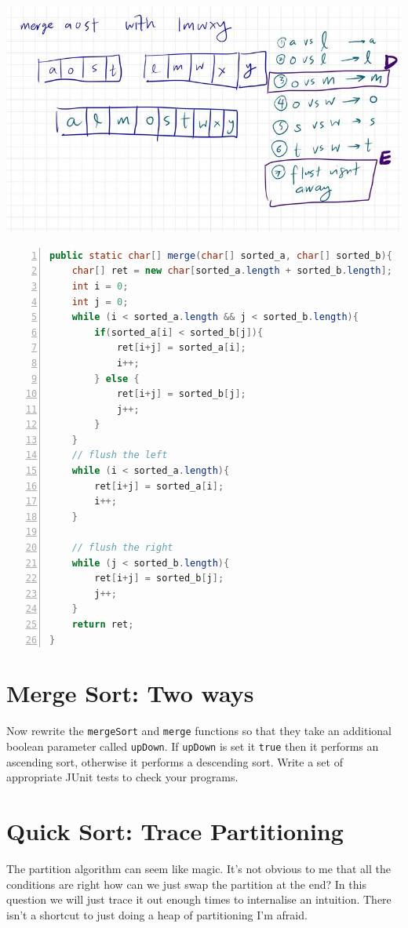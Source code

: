 \documentclass[twoside=false,DIV=14]{scrartcl}
\begin{document}
\includegraphics[width=\textwidth]{merge_trace_plus.jpeg}

\begin{lstlisting}[language=java,numbers=left]
public static char[] merge(char[] sorted_a, char[] sorted_b){
    char[] ret = new char[sorted_a.length + sorted_b.length];
    int i = 0;
    int j = 0;
    while (i < sorted_a.length && j < sorted_b.length){
        if(sorted_a[i] < sorted_b[j]){
            ret[i+j] = sorted_a[i];
            i++;
        } else {
            ret[i+j] = sorted_b[j];
            j++;                
        }
    }
    // flush the left
    while (i < sorted_a.length){
        ret[i+j] = sorted_a[i];
        i++;
    }

    // flush the right
    while (j < sorted_b.length){
        ret[i+j] = sorted_b[j];
        j++;
    }
    return ret;
}
\end{lstlisting}

\section{Merge Sort: Two ways}
Now rewrite the {\tt mergeSort}  and {\tt merge} functions so that they take an additional boolean parameter called {\tt upDown}. If  {\tt upDown} is set it {\tt true} then it performs an ascending sort, otherwise it performs a descending sort. Write a set of appropriate JUnit tests to check your programs.
    
\section{Quick Sort: Trace Partitioning}
The partition algorithm can seem like magic.  It's not obvious to me that all the conditions are right how can we just swap the partition at the end?  In this question we will just trace it out enough times to internalise an intuition.  There isn't a shortcut to just doing a heap of partitioning I'm afraid.
\end{document}
